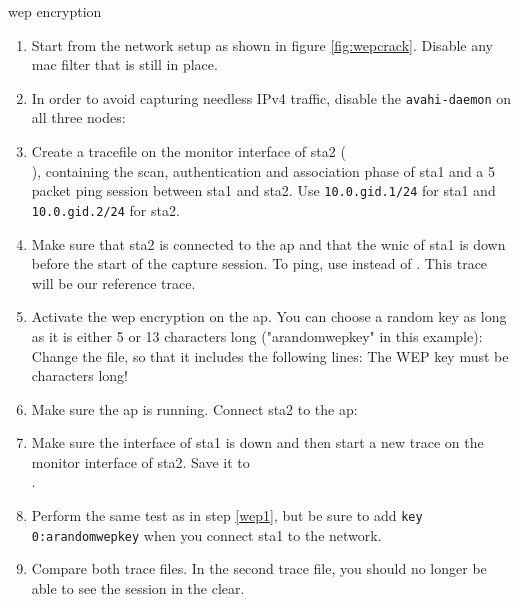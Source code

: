 \begin{exercise}{\ac{wep} encryption}
	\begin{enumerate}
		\item Start from the network setup as shown in figure \ref{fig:wepcrack}. Disable any \ac{mac} filter that is still in place.
		\item In order to avoid capturing needless IPv4 traffic, disable the \texttt{avahi-daemon} on all three nodes:\newline
		\item Create a tracefile on the monitor interface of \ac{sta}2 (\\), containing the scan, authentication and association phase of \ac{sta}1 and a 5 packet ping session between \ac{sta}1 and \ac{sta}2. Use \texttt{10.0.\acs{gid}.1/24} for \ac{sta}1 and \texttt{10.0.\acs{gid}.2/24} for \ac{sta}2.\newline
		\item Make sure that \ac{sta}2 is connected to the \ac{ap} and that the \ac{wnic} of \ac{sta}1 is down before the start of the capture session. To ping, use  instead of . This trace will be our reference trace. \label{wep1} 
		\item Activate the \ac{wep} encryption on the \ac{ap}. You can choose a random key as long as it is either 5 or 13 characters long ("arandomwepkey" in this example):\newline
		Change the  file, so that it includes the following lines:\newline
		\remark The WEP key must be  characters long!
		\item Make sure the \ac{ap} is running. Connect \ac{sta}2 to the \ac{ap}:\newline
		\item Make sure the interface of \ac{sta}1 is down and then start a new trace on the monitor interface of \ac{sta}2. Save it to \\.
		\item Perform the same test as in step \ref{wep1}, but be sure to add \texttt{key 0:arandomwepkey} when you connect \ac{sta}1 to the network.
		\item Compare both trace files. In the second trace file, you should no longer be able to see the  session in the clear.

\end{enumerate}
\end{exercise}
